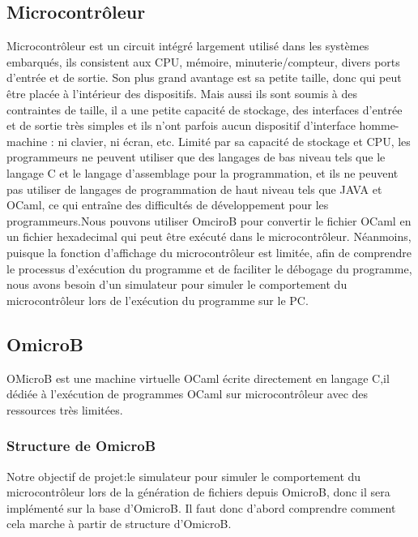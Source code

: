\documentclass[14px]{article}
\begin{document}
\subsection{Microcontrôleur}
Microcontrôleur est un circuit intégré largement utilisé dans les systèmes embarqués, ils consistent aux CPU, mémoire, minuterie/compteur, divers ports d'entrée et de sortie. Son plus grand avantage est sa petite taille, donc qui peut être placée à l'intérieur des dispositifs. Mais aussi ils sont soumis à des contraintes de taille, il a une petite capacité de stockage, des interfaces d'entrée et de sortie très simples et ils n'ont parfois aucun dispositif d'interface homme-machine : ni clavier, ni écran, etc. Limité par sa capacité de stockage et CPU, les programmeurs ne peuvent utiliser que des langages de bas niveau tels que le langage C et le langage d'assemblage pour la programmation, et ils ne peuvent pas utiliser de langages de programmation de haut niveau tels que JAVA et OCaml, ce qui entraîne des difficultés de développement pour les programmeurs.Nous pouvons utiliser OmciroB pour convertir le fichier OCaml en un fichier hexadecimal qui peut être exécuté dans le microcontrôleur. Néanmoins, puisque la fonction d'affichage du microcontrôleur est limitée, afin de comprendre le processus d'exécution du programme et de faciliter le débogage du programme, nous avons besoin d'un simulateur pour simuler le comportement du microcontrôleur lors de l'exécution du programme sur le PC.
\subsection{OmicroB}
OMicroB est une machine virtuelle OCaml écrite directement en langage C,il dédiée à l'exécution de programmes OCaml sur microcontrôleur avec des ressources très limitées.\\

\subsubsection{Structure de OmicroB}
Notre objectif de projet:le simulateur pour simuler le comportement du microcontrôleur lors de la génération de fichiers depuis OmicroB, donc il sera implémenté sur la base d'OmicroB. Il faut donc d'abord comprendre comment cela marche à partir de structure d'OmicroB.\\

\clearpage
\end{document}
